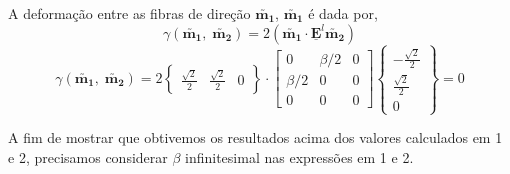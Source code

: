 \begin{enumerate}
    A deformação entre as fibras de direção $\utilde{\mathbf{m_1}}$, $\utilde{\mathbf{m_1}}$ é dada por,
    \[\gamma(\utilde{\mathbf{m_1}},\;\utilde{\mathbf{m_2}})=2(\utilde{\mathbf{m_1}}\cdot\underline{\mathbf{E}}^l\utilde{\mathbf{m_2}})\]
    \[
        \gamma(\utilde{\mathbf{m_1}},\;\utilde{\mathbf{m_2}})
        =
        2
        \begin{Bmatrix}
            \frac{\sqrt{2}}{2} & \frac{\sqrt{2}}{2} & 0
        \end{Bmatrix}
        \cdot
        \begin{bmatrix}
            0 & \beta/2 & 0 \\
            \beta/2 & 0 & 0 \\
            0 & 0 & 0
        \end{bmatrix}
        \begin{Bmatrix}
            -\frac{\sqrt{2}}{2} \\ \frac{\sqrt{2}}{2} \\ 0
        \end{Bmatrix}
        =0
    \]
    
    A fim de mostrar que obtivemos os resultados acima dos valores calculados em 1 e 2, precisamos considerar $\beta$ infinitesimal nas expressões em 1 e 2.
    
    
\end{enumerate}